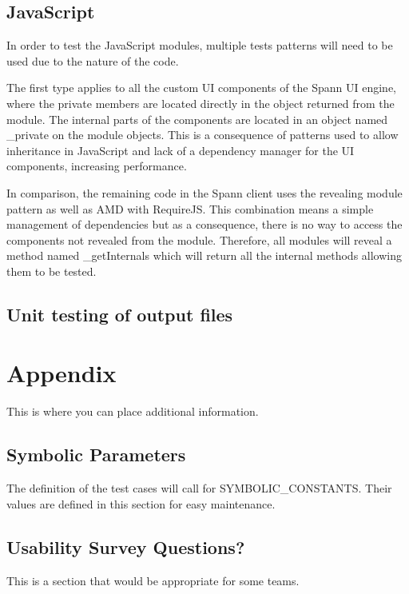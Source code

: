 \documentclass[12pt, titlepage]{article}
\begin{document}
\subsection{JavaScript}
In order to test the JavaScript modules, multiple tests patterns will need 
to be used due to the nature of the code. 

The first type applies to all the custom UI components of the Spann UI engine, 
where the private members are located directly in the object returned from the 
module. The internal parts of the components are located in an object named 
_private on the module objects. This is a consequence of patterns used to allow 
inheritance in JavaScript and lack of a dependency manager for the UI components, 
increasing performance.  

In comparison, the remaining code in the Spann client uses the revealing module 
pattern as well as AMD with RequireJS. This combination means a simple management 
of dependencies but as a consequence, there is no way to access the components not 
revealed from the module. Therefore, all modules will reveal a method named 
_getInternals which will return all the internal methods allowing them to be tested. 

		
\subsection{Unit testing of output files}		





\newpage

\section{Appendix}

This is where you can place additional information.

\subsection{Symbolic Parameters}

The definition of the test cases will call for SYMBOLIC\_CONSTANTS.
Their values are defined in this section for easy maintenance.

\subsection{Usability Survey Questions?}

This is a section that would be appropriate for some teams.
\end{document}

